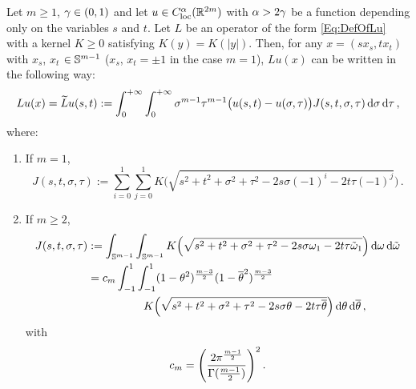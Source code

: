 \begin{lemma}
\label{Lemma:OperatorInSTVariables} Let $m \geq 1$, $\gamma\in(0,1)$ and let $u\in
C_{\mathrm{loc}}^\alpha(\mathbb{R}^{2m})$ with $\alpha > 2\gamma$ be a function depending only on the variables $s$ and
$t$. Let $L$ be an operator of the form \eqref{Eq:DefOfLu} with a kernel $K\geq 0$ satisfying $K(y)
= K(|y|)$. Then, for any $x = (s x_s, t x_t)$ with $x_s$, $x_t$ $\in \mathbb{S}^{m-1}$ ($x_s$, $x_t = \pm
1$ in the case $m=1$),  $Lu(x)$ can be written in the following way:
\begin{equation}
\label{Eq:OperatorInSTVariables}
Lu(x) = \widetilde{L} u (s,t) := \int_0^{+\infty}  \int_0^{+\infty} \sigma^{m-1} \tau^{m-1} \big(u(s,t) - u(\sigma, \tau)\big) J(s,t,\sigma, \tau)  \,\mathrm{d} \sigma\,\mathrm{d} \tau\,,
\end{equation}
where:
\begin{enumerate}
	\item If $m= 1$,
	\begin{equation}
		\label{Eq:KernelInSTVariablesR2}
	J(s,t,\sigma, \tau) := \sum_{i=0}^1  \sum_{j =0}^1  K\Big(\sqrt{s^2 + t^2 + \sigma^2 + \tau^2 -2 s \sigma (-1)^i -2 t \tau (-1)^j}\Big)\,.
	\end{equation}
	
	\item If $m\geq 2$,
	\begin{align}
	J(s,t,\sigma, \tau) &:= \int_{\mathbb{S}^{m-1}}  \int_{\mathbb{S}^{m-1}}  K\Big(\sqrt{s^2 + t^2 + \sigma^2 + \tau^2 -2 s \sigma \omega_1 -2 t \tau \tilde{\omega}_1}\Big) \,\mathrm{d} \omega \,\mathrm{d} \tilde{\omega}  \label{Eq:KernelSTVariables1}\\
	&= c_m \int_{-1}^1  \int_{-1}^1  (1-\theta^2)^{\frac{m-3}{2}} (1-\overline{\theta}^2)^{\frac{m-3}{2}} \nonumber\\
	& \quad \quad \quad \quad \quad
	K\Big(\sqrt{s^2 + t^2 + \sigma^2 + \tau^2 -2 s \sigma \theta -2 t \tau \overline{\theta}}\Big) \,\mathrm{d} \theta \,\mathrm{d} \overline{\theta}\,, \label{Eq:KernelSTVariables2}
	\end{align}
	with
	$$
	c_m = \left ( {\dfrac{2 \pi^{\frac{m-1}{2}}}{\Gamma (\frac{m-1}{2})}}\right )^2.
	$$
\end{enumerate}
\end{lemma}


